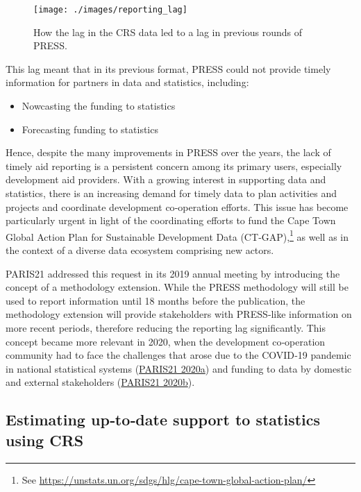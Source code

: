 \documentclass[
]{article}
\begin{document}
\begin{figure}

{\centering \texttt{[image: ./images/reporting\_lag]} 

}

\caption{How the lag in the CRS data led to a lag in previous rounds of PRESS.}\label{fig:reporting-lag}
\end{figure}

This lag meant that in its previous format, PRESS could not provide timely information for partners in
data and statistics, including:

\begin{itemize}
\item
  Nowcasting the funding to statistics
\item
  Forecasting funding to statistics
\end{itemize}

Hence, despite the many improvements in PRESS over the years, the lack of timely aid reporting is a
persistent concern among its primary users, especially development aid providers. With a growing
interest in supporting data and statistics, there is an increasing demand for timely data to plan
activities and projects and coordinate development co‐operation efforts. This issue has become
particularly urgent in light of the coordinating efforts to fund the Cape Town Global Action Plan for
Sustainable Development Data (CT‐GAP),\footnote{See \url{https://unstats.un.org/sdgs/hlg/cape-town-global-action-plan/}} as well as in the context of a diverse data ecosystem comprising new actors.

PARIS21 addressed this request in its 2019 annual meeting by introducing the concept of a
methodology extension. While the PRESS methodology will still be used to report information until 18
months before the publication, the methodology extension will provide stakeholders with PRESS‐like
information on more recent periods, therefore reducing the reporting lag significantly. This concept
became more relevant in 2020, when the development co‐operation community had to face the
challenges that arose due to the COVID‐19 pandemic in national statistical systems (\protect\hyperlink{ref-PARIS21-Covid}{PARIS21 2020a})
and funding to data by domestic and external stakeholders (\protect\hyperlink{ref-PRESS-2021}{PARIS21 2020b}).

\hypertarget{estimating-using-CRS}{%
\subsection{Estimating up‐to‐date support to statistics using CRS}\label{estimating-using-CRS}}
\end{document}
